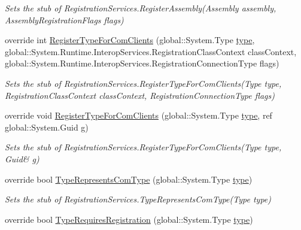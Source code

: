 \begin{DoxyCompactItemize}
\begin{DoxyCompactList}\small\item\em Sets the stub of Registration\-Services.\-Register\-Assembly(\-Assembly assembly, Assembly\-Registration\-Flags flags)\end{DoxyCompactList}\item 
override int \hyperlink{class_system_1_1_runtime_1_1_interop_services_1_1_fakes_1_1_stub_registration_services_add497d36cec7357bb3d5296fea37afd8}{Register\-Type\-For\-Com\-Clients} (global\-::\-System.\-Type \hyperlink{jquery-1_810_82-vsdoc_8js_a3940565e83a9bfd10d95ffd27536da91}{type}, global\-::\-System.\-Runtime.\-Interop\-Services.\-Registration\-Class\-Context class\-Context, global\-::\-System.\-Runtime.\-Interop\-Services.\-Registration\-Connection\-Type flags)
\begin{DoxyCompactList}\small\item\em Sets the stub of Registration\-Services.\-Register\-Type\-For\-Com\-Clients(\-Type type, Registration\-Class\-Context class\-Context, Registration\-Connection\-Type flags)\end{DoxyCompactList}\item 
override void \hyperlink{class_system_1_1_runtime_1_1_interop_services_1_1_fakes_1_1_stub_registration_services_a790ef0fe80e12781879c1655d2992cbd}{Register\-Type\-For\-Com\-Clients} (global\-::\-System.\-Type \hyperlink{jquery-1_810_82-vsdoc_8js_a3940565e83a9bfd10d95ffd27536da91}{type}, ref global\-::\-System.\-Guid g)
\begin{DoxyCompactList}\small\item\em Sets the stub of Registration\-Services.\-Register\-Type\-For\-Com\-Clients(Type type, Guid\& g)\end{DoxyCompactList}\item 
override bool \hyperlink{class_system_1_1_runtime_1_1_interop_services_1_1_fakes_1_1_stub_registration_services_a041d9179f16911cae7127693ad37a82e}{Type\-Represents\-Com\-Type} (global\-::\-System.\-Type \hyperlink{jquery-1_810_82-vsdoc_8js_a3940565e83a9bfd10d95ffd27536da91}{type})
\begin{DoxyCompactList}\small\item\em Sets the stub of Registration\-Services.\-Type\-Represents\-Com\-Type(\-Type type)\end{DoxyCompactList}\item 
override bool \hyperlink{class_system_1_1_runtime_1_1_interop_services_1_1_fakes_1_1_stub_registration_services_a63859a5db39642b8a76c35d62424a8cd}{Type\-Requires\-Registration} (global\-::\-System.\-Type \hyperlink{jquery-1_810_82-vsdoc_8js_a3940565e83a9bfd10d95ffd27536da91}{type})

\end{DoxyCompactItemize}
